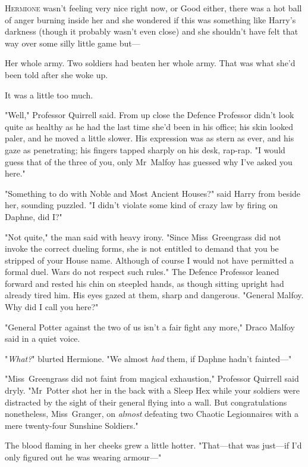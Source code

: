 
\lettrine{H}{ermione} wasn't
feeling very nice right now, or Good either, there was a hot ball of anger
burning inside her and she wondered if this was something like Harry's darkness
(though it probably wasn't even close) and she shouldn't have felt that way
over some silly little game but---

Her whole army. Two soldiers had beaten her whole army. That was what she'd
been told after she woke up.

It was a little too much.

"Well," Professor Quirrell said. From up close the Defence Professor didn't
look quite as healthy as he had the last time she'd been in his office; his
skin looked paler, and he moved a little slower. His expression was as stern as
ever, and his gaze as penetrating; his fingers tapped sharply on his desk,
rap-rap. "I would guess that of the three of you, only Mr~Malfoy has guessed
why I've asked you here."

"Something to do with Noble and Most Ancient Houses?" said Harry from beside
her, sounding puzzled. "I didn't violate some kind of crazy law by firing on
Daphne, did I?"

"Not quite," the man said with heavy irony. "Since Miss~Greengrass did not
invoke the correct dueling forms, she is not entitled to demand that you be
stripped of your House name. Although of course I would not have permitted a
formal duel. Wars do not respect such rules." The Defence Professor leaned
forward and rested his chin on steepled hands, as though sitting upright had
already tired him. His eyes gazed at them, sharp and dangerous. "General
Malfoy. Why did I call you here?"

"General Potter against the two of us isn't a fair fight any more," Draco Malfoy
said in a quiet voice.

"\emph{What?}" blurted Hermione. "We almost \emph{had} them, if Daphne hadn't
fainted---"

"Miss~Greengrass did not faint from magical exhaustion," Professor Quirrell
said dryly. "Mr~Potter shot her in the back with a Sleep Hex while your
soldiers were distracted by the sight of their general flying into a wall. But
congratulations nonetheless, Miss~Granger, on \emph{almost} defeating two
Chaotic Legionnaires with a mere twenty-four Sunshine Soldiers."

The blood flaming in her cheeks grew a little hotter. "That---that was
just---if I'd only figured out he was wearing armour---"

